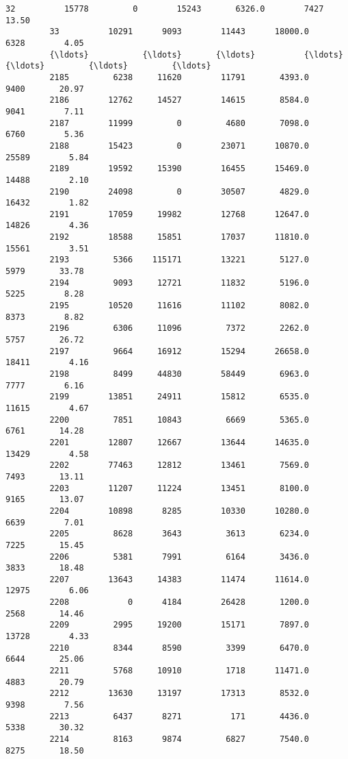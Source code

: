 \documentclass[11pt]{llncs}
\begin{document}
\begin{Verbatim}[commandchars=\\\{\}]
         32          15778         0        15243       6326.0        7427       13.50   
         33          10291      9093        11443      18000.0        6328        4.05   
         {\ldots}           {\ldots}       {\ldots}          {\ldots}          {\ldots}         {\ldots}         {\ldots}   
         2185         6238     11620        11791       4393.0        9400       20.97   
         2186        12762     14527        14615       8584.0        9041        7.11   
         2187        11999         0         4680       7098.0        6760        5.36   
         2188        15423         0        23071      10870.0       25589        5.84   
         2189        19592     15390        16455      15469.0       14488        2.10   
         2190        24098         0        30507       4829.0       16432        1.82   
         2191        17059     19982        12768      12647.0       14826        4.36   
         2192        18588     15851        17037      11810.0       15561        3.51   
         2193         5366    115171        13221       5127.0        5979       33.78   
         2194         9093     12721        11832       5196.0        5225        8.28   
         2195        10520     11616        11102       8082.0        8373        8.82   
         2196         6306     11096         7372       2262.0        5757       26.72   
         2197         9664     16912        15294      26658.0       18411        4.16   
         2198         8499     44830        58449       6963.0        7777        6.16   
         2199        13851     24911        15812       6535.0       11615        4.67   
         2200         7851     10843         6669       5365.0        6761       14.28   
         2201        12807     12667        13644      14635.0       13429        4.58   
         2202        77463     12812        13461       7569.0        7493       13.11   
         2203        11207     11224        13451       8100.0        9165       13.07   
         2204        10898      8285        10330      10280.0        6639        7.01   
         2205         8628      3643         3613       6234.0        7225       15.45   
         2206         5381      7991         6164       3436.0        3833       18.48   
         2207        13643     14383        11474      11614.0       12975        6.06   
         2208            0      4184        26428       1200.0        2568       14.46   
         2209         2995     19200        15171       7897.0       13728        4.33   
         2210         8344      8590         3399       6470.0        6644       25.06   
         2211         5768     10910         1718      11471.0        4883       20.79   
         2212        13630     13197        17313       8532.0        9398        7.56   
         2213         6437      8271          171       4436.0        5338       30.32   
         2214         8163      9874         6827       7540.0        8275       18.50   
         

\end{Verbatim}
\end{document}
